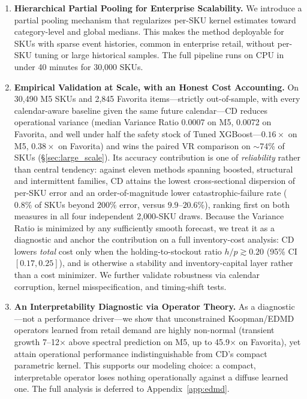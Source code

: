 \documentclass[10pt]{article} %
\theoremstyle{plain}
\theoremstyle{definition}
\begin{document}
\begin{enumerate}
  \item \textbf{Hierarchical Partial Pooling for Enterprise Scalability.} We introduce a partial pooling mechanism that regularizes per-SKU kernel estimates toward category-level and global medians. This makes the method deployable for SKUs with sparse event histories, common in enterprise retail, without per-SKU tuning or large historical samples. The full pipeline runs on CPU in under 40 minutes for 30,000 SKUs.
  
  \item \textbf{Empirical Validation at Scale, with an Honest Cost Accounting.} On 30,490 M5 SKUs and 2,845 Favorita items---strictly out-of-sample, with every calendar-aware baseline given the same future calendar---CD reduces operational variance (median Variance Ratio 0.0007 on M5, 0.0072 on Favorita, and well under half the safety stock of Tuned XGBoost---$0.16\times$ on M5, $0.38\times$ on Favorita) and wins the paired VR comparison on $\sim$74\% of SKUs (\S\ref{sec:large_scale}). Its accuracy contribution is one of \emph{reliability} rather than central tendency: against eleven methods spanning boosted, structural and intermittent families, CD attains the lowest cross-sectional dispersion of per-SKU error and an order-of-magnitude lower catastrophic-failure rate ($0.8\%$ of SKUs beyond $200\%$ error, versus $9.9$--$20.6\%$), ranking first on both measures in all four independent 2{,}000-SKU draws. Because the Variance Ratio is minimized by any sufficiently smooth forecast, we treat it as a diagnostic and anchor the contribution on a full inventory-cost analysis: CD lowers \emph{total} cost only when the holding-to-stockout ratio $h/p \gtrsim 0.20$ (95\% CI $[0.17, 0.25]$), and is otherwise a stability and inventory-capital layer rather than a cost minimizer. We further validate robustness via calendar corruption, kernel misspecification, and timing-shift tests.

  \item \textbf{An Interpretability Diagnostic via Operator Theory.} As a diagnostic---not a performance driver---we show that unconstrained Koopman/EDMD operators learned from retail demand are highly non-normal (transient growth 7--12$\times$ above spectral prediction on M5, up to 45.9$\times$ on Favorita), yet attain operational performance indistinguishable from CD's compact parametric kernel. This supports our modeling choice: a compact, interpretable operator loses nothing operationally against a diffuse learned one. The full analysis is deferred to Appendix~\ref{app:edmd}.
\end{enumerate}
\end{document}
